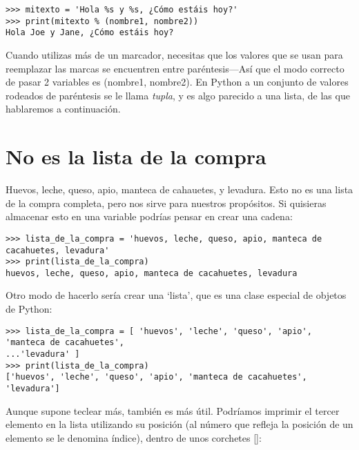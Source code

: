 \begin{listing}
\begin{verbatim}
>>> mitexto = 'Hola %s y %s, ¿Cómo estáis hoy?'
>>> print(mitexto % (nombre1, nombre2))
Hola Joe y Jane, ¿Cómo estáis hoy?
\end{verbatim}
\end{listing}

Cuando utilizas más de un marcador, necesitas que los valores que se usan para reemplazar las marcas se encuentren entre paréntesis---Así que el modo correcto de pasar 2 variables es (nombre1, nombre2). En Python a un conjunto de valores rodeados de paréntesis se le llama \emph{tupla}, y es algo parecido a una lista, de las que hablaremos a continuación.

\section{No es la lista de la compra}

Huevos, leche, queso, apio, manteca de cahauetes, y levadura. Esto no es una lista de la compra completa, pero nos sirve para nuestros propósitos. Si quisieras almacenar esto en una variable podrías pensar en crear una cadena:

\begin{listing}
\begin{verbatim}
>>> lista_de_la_compra = 'huevos, leche, queso, apio, manteca de cacahuetes, levadura'
>>> print(lista_de_la_compra)
huevos, leche, queso, apio, manteca de cacahuetes, levadura
\end{verbatim}
\end{listing}

Otro modo de hacerlo sería crear una `lista', que es una clase especial de objetos de Python:

\begin{listing}
\begin{verbatim}
>>> lista_de_la_compra = [ 'huevos', 'leche', 'queso', 'apio', 'manteca de cacahuetes',
...'levadura' ]
>>> print(lista_de_la_compra)
['huevos', 'leche', 'queso', 'apio', 'manteca de cacahuetes', 'levadura']
\end{verbatim}
\end{listing}

Aunque supone teclear más, también es más útil. Podríamos imprimir el tercer elemento en la lista utilizando su posición (al número que refleja la posición de un elemento se le denomina índice), dentro de unos corchetes []: 

